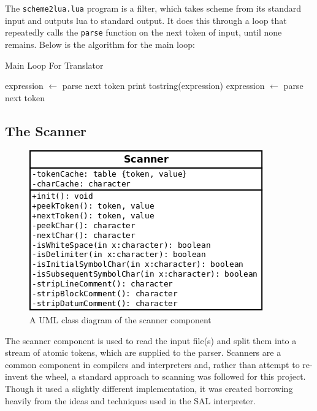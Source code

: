 The \texttt{scheme2lua.lua} program is a filter, which takes scheme from its
standard input and outputs lua to standard output. It does this through a loop
that repeatedly calls the \texttt{parse} function on the next token of input,
until none remains. Below is the algorithm for the main loop:

\begin{algorithm}
\caption{Main Loop For Translator}
\label{alg:mainloop}
\begin{algorithmic}
\STATE expression $\leftarrow$ parse next token  
\STATE print tostring(expression)
\STATE expression $\leftarrow$ parse next token
\ENDWHILE
\end{algorithmic}
\end{algorithm}

\subsection{The Scanner}

\begin{figure}
\centering
\includegraphics[width=\textwidth]{scannerUML.png}
\caption{A UML class diagram of the scanner component}
\label{fig:scannerUML}
\end{figure}

The scanner component is used to read the input file(s) and split them into a
stream of atomic tokens, which are supplied to the parser. Scanners are a common
component in compilers and interpreters and, rather than attempt to re-invent
the wheel, a standard approach to scanning was followed for this project.
Though it used a slightly different implementation, it was created borrowing
heavily from the ideas and techniques used in the SAL interpreter\cite{sal}.

